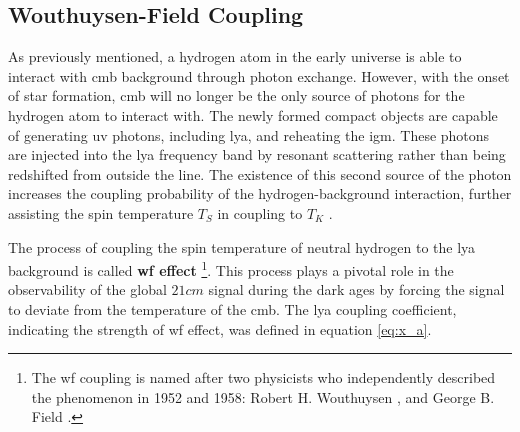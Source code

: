 \documentclass[12pt, TexShade, letterpaper]{report}
\begin{document}
\subsection{Wouthuysen-Field Coupling}
As previously mentioned, a hydrogen atom in the early universe is able to interact with \gls{cmb} background through photon exchange. However, with the onset of star formation, \gls{cmb} will no longer be the only source of photons for the hydrogen atom to interact with. The newly formed compact objects are capable of generating \gls{uv} photons, including \gls{lya}, and reheating the \gls{igm}. These photons are injected into the \gls{lya} frequency band by resonant scattering rather than being redshifted from outside the line. The existence of this second source of the photon increases the coupling probability of the hydrogen-background interaction, further assisting the spin temperature $T_S$ in coupling to $T_K$ \cite{21century, low_frequency}.\par
The process of coupling the spin temperature of neutral hydrogen to the \gls{lya} background is called \textbf{\gls{wf} effect} \cite{barkana2001beginning}\footnote{The \gls{wf} coupling is named after two physicists who independently described the phenomenon in 1952 and 1958: Robert H. Wouthuysen \cite{wouthuysen_original}, and George B. Field \cite{field_original}.}. This process plays a pivotal role in the observability of the global $21cm$ signal during the dark ages by forcing the signal to deviate from the temperature of the \gls{cmb}. The \gls{lya} coupling coefficient, indicating the strength of \gls{wf} effect, was defined in equation \ref{eq:x_a}. \par
\end{document}
